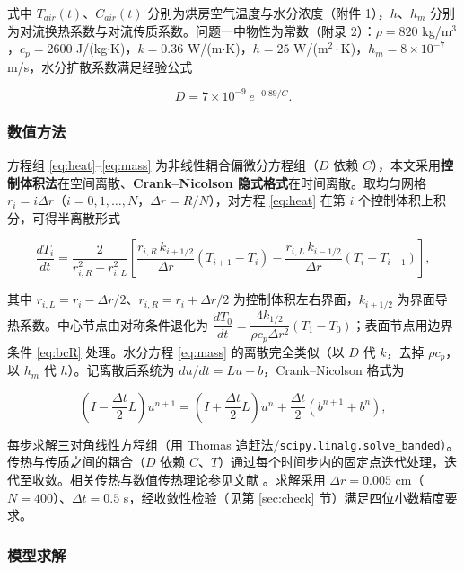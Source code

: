 式中 $T_{air}(t)$、$C_{air}(t)$ 分别为烘房空气温度与水分浓度（附件 1），$h$、$h_m$ 分别为对流换热系数与对流传质系数。问题一中物性为常数（附录 2）：$\rho=820$ kg/m$^3$，$c_p=2600$ J/(kg$\cdot$K)，$k=0.36$ W/(m$\cdot$K)，$h=25$ W/(m$^2\cdot$K)，$h_m=8\times10^{-7}$ m/s，水分扩散系数满足经验公式

\begin{equation}
	D = 7\times10^{-9}\, e^{-0.89/C}.
	\label{eq:D1}
\end{equation}

\subsubsection{数值方法}

方程组 \eqref{eq:heat}--\eqref{eq:mass} 为非线性耦合偏微分方程组（$D$ 依赖 $C$），本文采用\textbf{控制体积法}在空间离散、\textbf{Crank--Nicolson 隐式格式}在时间离散。取均匀网格 $r_i=i\Delta r$（$i=0,1,\dots,N$，$\Delta r=R/N$），对方程 \eqref{eq:heat} 在第 $i$ 个控制体积上积分，可得半离散形式

\begin{equation}
	\frac{d T_i}{dt} = \frac{2}{r_{i,R}^2-r_{i,L}^2}\left[\frac{r_{i,R}\, k_{i+1/2}}{\Delta r}(T_{i+1}-T_i)-\frac{r_{i,L}\, k_{i-1/2}}{\Delta r}(T_i-T_{i-1})\right],
	\label{eq:discheat}
\end{equation}

其中 $r_{i,L}=r_i-\Delta r/2$、$r_{i,R}=r_i+\Delta r/2$ 为控制体积左右界面，$k_{i\pm1/2}$ 为界面导热系数。中心节点由对称条件退化为 $\dfrac{dT_0}{dt}=\dfrac{4k_{1/2}}{\rho c_p\Delta r^2}(T_1-T_0)$；表面节点用边界条件 \eqref{eq:bcR} 处理。水分方程 \eqref{eq:mass} 的离散完全类似（以 $D$ 代 $k$，去掉 $\rho c_p$，以 $h_m$ 代 $h$）。记离散后系统为 $du/dt=Lu+b$，Crank--Nicolson 格式为

\begin{equation}
	\left(I-\frac{\Delta t}{2}L\right) u^{n+1} = \left(I+\frac{\Delta t}{2}L\right) u^{n} + \frac{\Delta t}{2}\left(b^{n+1}+b^n\right),
	\label{eq:cn}
\end{equation}

每步求解三对角线性方程组（用 Thomas 追赶法/\texttt{scipy.linalg.solve\_banded}）\cite{crank1947practical}。传热与传质之间的耦合（$D$ 依赖 $C$、$T$）通过每个时间步内的固定点迭代处理，迭代至收敛。相关传热与数值传热理论参见文献 \cite{yang2006heat,tao2001numerical}。求解采用 $\Delta r=0.005$ cm（$N=400$）、$\Delta t=0.5$ s，经收敛性检验（见第 \ref{sec:check} 节）满足四位小数精度要求。

\subsubsection{模型求解}

